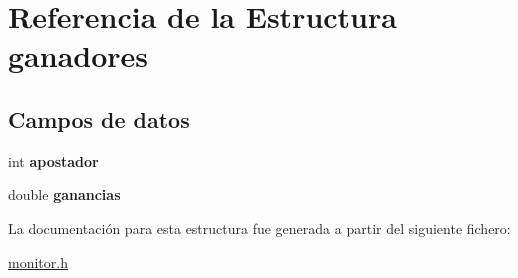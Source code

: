 \hypertarget{structganadores}{}\section{Referencia de la Estructura ganadores}
\label{structganadores}
\subsection*{Campos de datos}
\begin{DoxyCompactItemize}
\item 
\mbox{\label{structganadores_a52ecb0125931fc8beefef0a77c43040e}} 
int {\bfseries apostador}
\item 
\mbox{\label{structganadores_ace9dab5226a5e3c68ac8f5fb849ef4c5}} 
double {\bfseries ganancias}
\end{DoxyCompactItemize}


La documentación para esta estructura fue generada a partir del siguiente fichero\+:\begin{DoxyCompactItemize}
\item 
\hyperlink{monitor_8h}{monitor.\+h}\end{DoxyCompactItemize}

